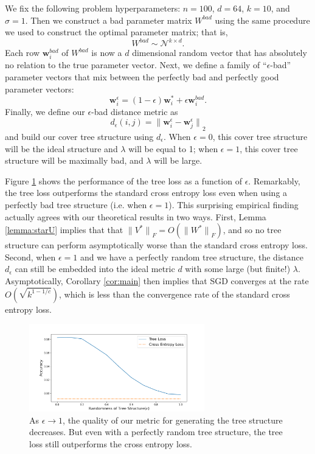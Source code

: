 \documentclass[twoside]{article}
\renewcommand{\star}[1]{{#1}^{*}}
\newcommand{\bad}[1]{{#1}^{\textit{bad}}}
\newcommand{\w}{\mathbf w}
\newcommand{\ltwo}[1]{{\lVert {#1} \rVert}_2}
\newcommand{\lF}[1]{{\lVert {#1} \rVert}_F}
\begin{document}
We fix the following problem hyperparameters:
$n=100$, $d=64$, $k=10$, and $\sigma=1$.
Then we construct a bad parameter matrix $\bad W$ using the same procedure we used to construct the optimal parameter matrix;
that is,
\begin{equation}
    \bad W \sim \mathcal N ^ {k\times d}
    .
\end{equation}
Each row $\bad \w_i$ of $\bad W$ is now a $d$ dimensional random vector that has absolutely no relation to the true parameter vector.
Next, we define a family of ``$\epsilon$-bad'' parameter vectors that mix between the perfectly bad and perfectly good parameter vectors:
\begin{equation}
    \w^\epsilon_i = (1-\epsilon) \w^*_i + \epsilon \bad\w_i.
\end{equation}
Finally, we define our $\epsilon$-bad distance metric as
\begin{equation}
    d_\epsilon(i,j) = \ltwo{\w_i^\epsilon - \w_j^\epsilon}
\end{equation}
and build our cover tree structure using $d_\epsilon$.
When $\epsilon=0$, this cover tree structure will be the ideal structure and $\lambda$ will be equal to 1;
when $\epsilon=1$, this cover tree structure will be maximally bad, and $\lambda$ will be large.

Figure \ref{fig:synth:eps} shows the performance of the tree loss as a function of $\epsilon$.
Remarkably, the tree loss outperforms the standard cross entropy loss even when using a perfectly bad tree structure (i.e. when $\epsilon=1$).
This surprising empirical finding actually agrees with our theoretical results in two ways.
First, Lemma \ref{lemma:starU} implies that that $\lF{\star V} = O(\lF{\star W})$,
and so no tree structure can perform asymptotically worse than the standard cross entropy loss.
Second, when $\epsilon=1$ and we have a perfectly random tree structure,
the distance $d_\epsilon$ can still be embedded into the ideal metric $d$ with some large (but finite!) $\lambda$.
Asymptotically, Corollary \ref{cor:main} then implies that SGD converges at the rate $O(\sqrt{k^{1-1/c}})$,
which is less than the convergence rate of the standard cross entropy loss.

\begin{figure}
\includegraphics[width=\columnwidth,height=1.5in]{fig/new_img/loss_vs_structure.png}
\caption{
As $\epsilon\to1$, the quality of our metric for generating the tree structure decreases.
But even with a perfectly random tree structure,
the tree loss still outperforms the cross entropy loss.
}  
\label{fig:synth:eps}
\end{figure}
\end{document}

